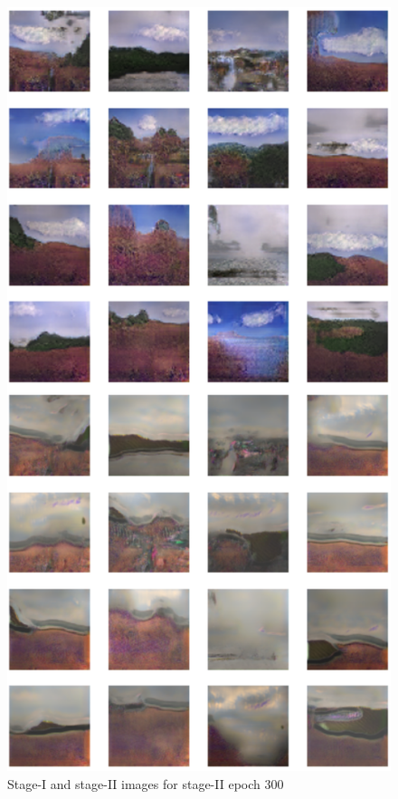 \documentclass{article}
\begin{document}
	\begin{figure}[h]
	\centering
	\includegraphics[scale=0.6]{images/epoch300_FID420.png}
	\caption{Stage-I and stage-II images for stage-II epoch 300}
	\end{figure}
\end{document}
